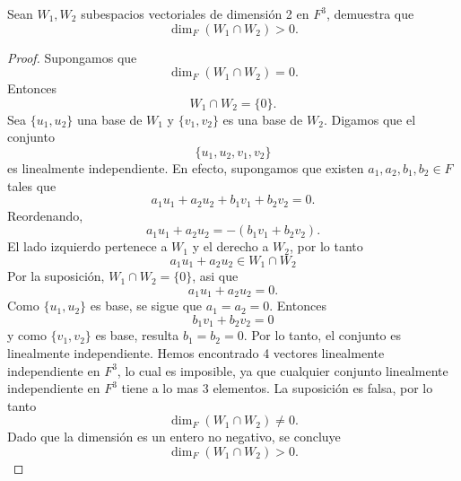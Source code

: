 \documentclass[12pt,a4paper]{article}
\begin{document}
    \begin{mdframed}[style=mdbluebox,frametitle={Ejercicio 3}]
        Sean $W_{1},W_{2}$ subespacios vectoriales de dimensión 2 en $F^{3}$, demuestra que
        \begin{equation*}
            \dim_{F}(W_{1}\cap W_{2})\gt0.
        \end{equation*}
    \end{mdframed}

    \begin{proof}
        Supongamos que
        \begin{equation*}
            \dim_{F}(W_{1}\cap W_{2})=0.
        \end{equation*}
        Entonces
        \begin{equation*}
            W_{1}\cap W_{2}=\{0\}.
        \end{equation*}
        Sea $\{u_{1},u_{2}\}$ una base de $W_{1}$ y $\{v_{1},v_{2}\}$ es una base de $W_{2}$.
        Digamos que el conjunto
        \begin{equation*}
            \{u_{1},u_{2},v_{1},v_{2}\}
        \end{equation*}
        es linealmente independiente. En efecto, supongamos que existen $a_{1},a_{2},b_{1},b_{2}\in F$
        tales que
        \begin{equation*}
            a_{1}u_{1}+a_{2}u_{2}+b_{1}v_{1}+b_{2}v_{2}=0.
        \end{equation*}
        Reordenando,
        \begin{equation*}
            a_{1}u_{1}+a_{2}u_{2}=-(b_{1}v_{1}+b_{2}v_{2}).
        \end{equation*}
        El lado izquierdo pertenece a $W_{1}$ y el derecho a $W_{2}$, por lo tanto
        \begin{equation*}
            a_{1}u_{1}+a_{2}u_{2}\in W_{1}\cap W_{2}
        \end{equation*}
        Por la suposición, $W_{1}\cap W_{2}=\{0\}$, asi que
        \begin{equation*}
            a_{1}u_{1}+a_{2}u_{2}=0.
        \end{equation*}
        Como $\{u_{1},u_{2}\}$ es base, se sigue que $a_{1}=a_{2}=0$. Entonces
        \begin{equation*}
            b_{1}v_{1}+b_{2}v_{2}=0
        \end{equation*}
        y como $\{v_{1},v_{2}\}$ es base, resulta $b_{1}=b_{2}=0$. Por lo tanto,
        el conjunto es linealmente independiente. Hemos encontrado 4 vectores linealmente
        independiente en $F^{3}$, lo cual es imposible, ya que cualquier conjunto linealmente
        independiente en $F^{3}$ tiene a lo mas 3 elementos. La suposición es falsa,
        por lo tanto
        \begin{equation*}
            \dim_{F}(W_{1}\cap W_{2})\neq0.
        \end{equation*}
        Dado que la dimensión es un entero no negativo, se concluye
        \begin{equation*}
            \dim_{F}(W_{1}\cap W_{2})\gt0.
        \end{equation*}
    \end{proof}
\end{document}
